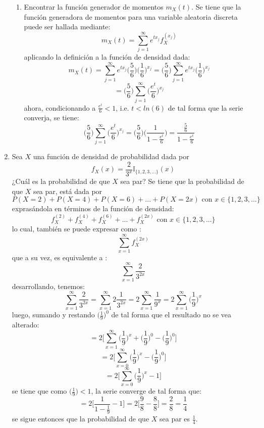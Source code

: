 \documentclass[12pt,a4paper]{report}
\begin{document}
\begin{enumerate}
{\begin{enumerate}
				\item {
					Encontrar la función generador de momentos $m_X(t)$.
				}
				\newline
				Se tiene que la función generadora de momentos para una variable
				aleatoria discreta puede ser hallada mediante:
					$$ m_X(t) = \sum_{j = 1}^{\infty} e^{tx_j} f_X^{(x_j)} $$
				aplicando la definición a la función de densidad dada:
					$$  m_X(t)
					 = \sum_{j = 1}^{\infty} e^{tx_j} \Big( \frac{5}{6} \Big)
					   \Big(\frac{1}{6}\Big)^{x_j}
					 = \Big( \frac{5}{6} \Big) \sum_{j = 1}^{\infty} e^{tx_j}
					   \Big(\frac{1}{6}\Big)^{x_j} $$
					$$ = \Big( \frac{5}{6} \Big) \sum_{j = 1}^{\infty}
					     \Big(\frac{e^t}{6}\Big)^{x_j} $$
				ahora, condicionando a $ \frac{e^t}{6} < 1 $, i.e. $ t < ln(6) $
				de tal forma que la serie converja, se tiene:
					$$ \Big( \frac{5}{6} \Big) \sum_{j = 1}^{\infty}
					     \Big(\frac{e^t}{6}\Big)^{x_j}
					 = \Big( \frac{5}{6} \Big)
					   \Big( \frac{1}{ 1 - \frac{e^t}{6}} \Big)
					 = \frac{\frac{5}{6}}{ 1 - \frac{e^t}{6}}$$
			\end{enumerate}
		}

		\item{
			Sea $X$ una función de densidad de probabilidad dada por
			\[f_X(x) = \frac{2}{3^x} \mathbb{I}_{\{1, 2, 3, ...\}}(x)\]
			¿Cuál es la probabilidad de que $X$ sea par?
		}
		\newline
		Se tiene que la probabilidad de que $X$ sea par, está dada por
			$$ P(X = 2) + P(X = 4) + P(X = 6) + ... + P(X = 2x) \text{ con }
			   x \in \{1,2,3, ...\} $$
		exprasándola en términos de la función de densidad:
			$$ f_X^{(2)} + f_X^{(4)} + f_X^{(6)} + ... + f_X^{(2x)} \text{ con }
			   x \in \{1,2,3, ...\} $$
		lo cual, también se puede expresar como :
			$$ \sum_{x = 1}^{\infty} f_X^{(2x)} $$
		que a su vez, es equivalente a :
			$$ \sum_{x = 1}^{\infty} \frac{2}{3^{2x}} $$
		desarrollando, tenemos:
			$$ \sum_{x = 1}^{\infty} \frac{2}{3^{2x}}
			 = \sum_{x = 1}^{\infty} 2 \frac{1}{3^{2x}}
			 = 2 \sum_{x = 1}^{\infty} \frac{1}{9^x}
			 = 2 \sum_{x = 1}^{\infty} \Big( \frac{1}{9} \Big)^x $$
		luego, sumando y restando $ \Big( \frac{1}{9} \Big)^0  $ de tal forma
		que el resultado no se vea alterado:
			$$ = 2 \Big[ \sum_{x = 1}^{\infty} \Big( \frac{1}{9} \Big)^x
			   + \Big( \frac{1}{9} \Big)^0 - \Big( \frac{1}{9} \Big)^0 \Big] $$
			$$ = 2 \Big[  \sum_{x = 0}^{\infty} \Big( \frac{1}{9} \Big)^x
			   - \Big( \frac{1}{9} \Big)^0 \Big] $$
			$$ = 2 \Big[ \sum_{x = 0}^{\infty} \Big( \frac{1}{9} \Big)^x
			   - 1 \Big] $$
		se tiene que como $ \Big( \frac{1}{9} \Big) < 1 $, la serie converge de
		tal forma que:
			$$ = 2 \Big[ \frac{1}{1 - \frac{1}{9}} - 1 \Big]
			   = 2 \Big[ \frac{9}{8} - \frac{8}{8} \Big] = \frac{2}{8}
			   = \frac{1}{4}$$
		se sigue entonces que la probabilidad de que $X$ sea par es
		$\frac{1}{4}$.


\end{enumerate}
\end{document}
